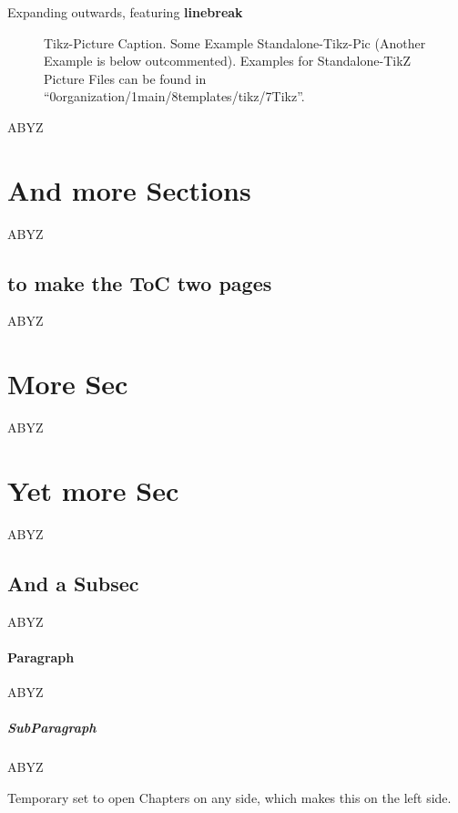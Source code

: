 \par\vspace{1.0\baselineskip}
\noindent Expanding outwards, featuring \textbf{linebreak}\nl%
{%
	\Large%
	\par%
}%
\par


\np
%
\begin{figure}[!htpb]
	\centering
	\caption{Tikz-Picture Caption. Some Example Standalone-Tikz-Pic (Another Example is below outcommented). Examples for Standalone-TikZ Picture Files can be found in \enquote{0organization/1main/8templates/tikz/7Tikz}.}
	\label{fig:tikz_test}
\end{figure}
%
%
%
%
 


\setcounter{\DenKrHeadingTopLvl}{9}
 ABYZ
\label{chap:twoDigit}
\section{And more Sections} ABYZ
\label{sec:justMore}
\subsection{to make the ToC two pages} ABYZ
\label{subsec:twoPages}
\section{More Sec} ABYZ
\section{Yet more Sec} ABYZ
\subsection{And a Subsec} ABYZ
\paragraph{Paragraph} ABYZ
\subparagraph{SubParagraph} ABYZ





\headingOpenTempAny%
\headingOpenTempRestore%

Temporary set to open Chapters on any side, which makes this on the left side.